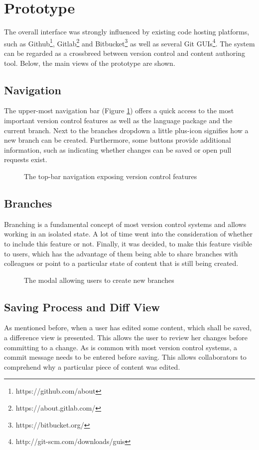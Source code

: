 \section{Prototype}
The overall interface was strongly influenced by existing code hosting platforms, such as Github\footnote{https://github.com/about}, Gitlab\footnote{https://about.gitlab.com/} and Bitbucket\footnote{https://bitbucket.org/} as well as several Git GUIs\footnote{http://git-scm.com/downloads/guis}. The system can be regarded as a crossbreed between version control and content authoring tool. Below, the main views of the prototype are shown.

\subsection{Navigation}
The upper-most navigation bar (Figure \ref{fig:navigation-top}) offers a quick access to the most important version control features as well as the language package and the current branch. Next to the branches dropdown a little plus-icon signifies how a new branch can be created. Furthermore, some buttons provide additional information, such as indicating whether changes can be saved or open pull requests exist.

\begin{figure}[h!]
 \centering
 \caption{The top-bar navigation exposing version control features}
 \label{fig:navigation-top}
\end{figure}

\subsection{Branches}
Branching is a fundamental concept of most version control systems and allows working in an isolated state. A lot of time went into the consideration of whether to include this feature or not. Finally, it was decided, to make this feature visible to users, which has the advantage of them being able to share branches with colleagues or point to a particular state of content that is still being created.

\begin{figure}[h!]
 \centering
 \caption{The modal allowing users to create new branches}
 \label{fig:create-branch}
\end{figure}

\subsection{Saving Process and Diff View}
As mentioned before, when a user has edited some content, which shall be saved, a difference view is presented. This allows the user to review her changes before committing to a change. As is common with most version control systems, a commit message needs to be entered before saving. This allows collaborators to comprehend why a particular piece of content was edited.

